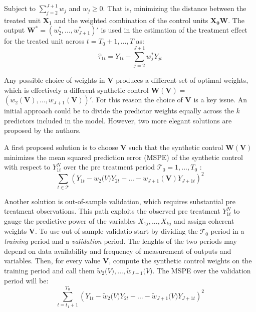 \documentclass[12pt,a4paper,draft]{article}
\begin{document}
Subject to $\sum_{j=2}^{J+1}w_j$ and $w_j \geq 0$. That is, minimizing the distance 
between the treated unit $\mathbf{X}_1$ and the weighted combination of the 
control units $\mathbf{X_0} \mathbf{W}$. The output $\mathbf{W}^*=
\left( w_2^*,...,w_{J+1}^*\right) '$ is used in the estimation of the treatment 
effect for the treated unit across $t=T_0+1,...,T$ as:
\begin{equation}
    \hat{\tau}_{1t} = Y_{1t} - \sum_{j=2}^{J+1}{w^*_j Y_{jt}}
\end{equation}


Any possible choice of weights in $\mathbf{V}$ produces a different set of optimal 
weights, which is effectively a different synthetic control 
$\mathbf{W}(\mathbf{V})=$ \newline $\left(w_2(\mathbf{V}),...,w_{J+1}(\mathbf{V})\right)'$.
For this reason the choice of $\mathbf{V}$ is a key issue. An initial approach could 
be to divide the predictor weights equally across the $k$ predictors included in the 
model. However, two more elegant solutions are proposed by the authors.

A first proposed solution is to choose $\mathbf{V}$ such that the synthetic control 
$\mathbf{W}(\mathbf{V})$ minimizes the mean squared prediction error (MSPE) of 
the synthetic control with respect to $Y_{1t}^N$ over the pre treatment period
$\mathcal{T}_0 = 1,..., T_0$ : 
\begin{equation}
    \sum_{t\in\mathcal{T}} {\left(
    Y_{1t}-w_2\mathbf(V)Y_{2t}-...-w_{J+1}(\mathbf{V})Y_{J+1t}
\right)} ^2
\end{equation}


Another solution is out-of-sample validation, which requires substantial pre 
treatment observations. This path exploits the observed pre treatment $Y_{1t}^N$
to gauge the predictive power of the variables $X_{1j},...,X_{kj}$ and assign 
coherent weights $\mathbf{V}$. To use out-of-sample validatio start by 
dividing the $\mathcal{T}_0$ period in a \emph{training} period and a 
\emph{validation} period. The lenghts of the two periods may depend on data 
availability and frequency of measurement of outputs and variables. Then, for 
every value $\mathbf{V}$, compute the synthetic control weights on the training 
period and call them $\tilde{w}_2 \mathbf(V), ..., \tilde{w}_{J+1} \mathbf(V)$.
The MSPE over the validation period will be:
\begin{equation}
    \sum_{t=t_1+1}^{T_0} \left(
    Y_{1t}-\tilde{w}_2 \mathbf(V) Y_{2t} - ... - 
    \tilde{w}_{J+1} \mathbf(V) Y_{J+1t} \right)^2
\end{equation}
\end{document}
